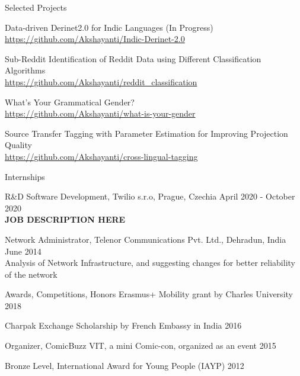 \documentclass{resume} %
\begin{document}
\begin{rSection}{Selected Projects}

    {Data-driven Derinet2.0 for Indic Languages (In Progress)}\\
        \url{https://github.com/Akshayanti/Indic-Derinet-2.0}

    {Sub-Reddit Identification of Reddit Data using Different Classification Algorithms}\\
        \url{https://github.com/Akshayanti/reddit_classification}

    {What's Your Grammatical Gender?}\\
        \url{https://github.com/Akshayanti/what-is-your-gender}

    {Source Transfer Tagging with Parameter Estimation for Improving Projection Quality}\\
        \url{https://github.com/Akshayanti/cross-lingual-tagging}

\end{rSection}



\begin{rSection}{Internships}

    {R\&D Software Development, Twilio s.r.o, Prague, Czechia} 
        \hfill {April 2020 - October 2020}\\
            \textbf{JOB DESCRIPTION HERE}
    
    {Network Administrator, Telenor Communications Pvt. Ltd., Dehradun, India} 
        \hfill {June 2014}\\
            Analysis of Network Infrastructure, and suggesting changes for 
            better reliability of the network

\end{rSection}




\begin{rSection}{Awards, Competitions, Honors}
    {Erasmus+ Mobility grant by Charles University} \hfill
        {2018}

    {Charpak Exchange Scholarship by French Embassy in India} \hfill
        {2016}

    {Organizer, ComicBuzz VIT, a mini Comic-con, organized as an event} \hfill
        {2015}

    {Bronze Level, International Award for Young People (IAYP)} \hfill
        {2012}
\end{rSection}
\end{document}
